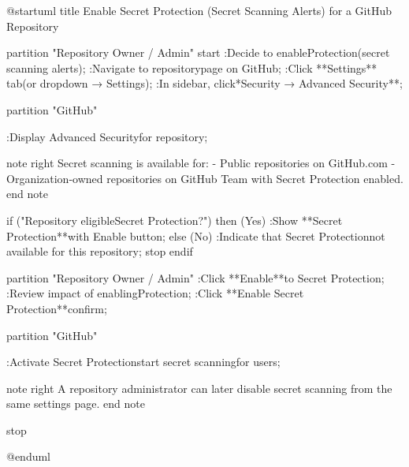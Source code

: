@startuml
title Enable Secret Protection (Secret Scanning Alerts) for a GitHub Repository

partition "Repository Owner / Admin" {
  start
  :Decide to enable\nSecret Protection\n(secret scanning alerts);
  :Navigate to repository\nmain page on GitHub;
  :Click **Settings** tab\n(or dropdown → Settings);
  :In sidebar, click\n**Security → Advanced Security**;
}

partition "GitHub" {
  :Display Advanced Security\nsettings for repository;

  note right
    Secret scanning is available for:
    - Public repositories on GitHub.com
    - Organization-owned repositories
      on GitHub Team with
      Secret Protection enabled.
  end note

  if ("Repository eligible\nfor Secret Protection?") then (Yes)
    :Show **Secret Protection**\ncontrol with Enable button;
  else (No)
    :Indicate that Secret Protection\nis not available for this repository;
    stop
  endif
}

partition "Repository Owner / Admin" {
  :Click **Enable**\nnext to Secret Protection;
  :Review impact of enabling\nSecret Protection;
  :Click **Enable Secret Protection**\nto confirm;
}

partition "GitHub" {
  :Activate Secret Protection\nand start secret scanning\nalerts for users;

  note right
    A repository administrator
    can later disable secret scanning
    from the same settings page.
  end note

  stop
}

@enduml



